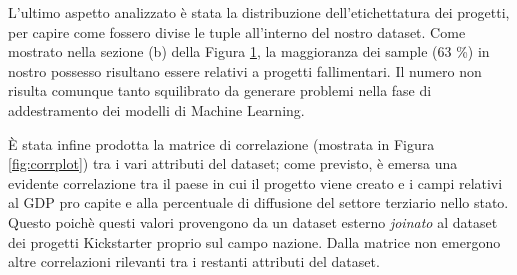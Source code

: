 L'ultimo aspetto analizzato è stata la distribuzione dell'etichettatura dei progetti, per capire come fossero divise le tuple all'interno del nostro dataset. Come mostrato nella sezione (b) della Figura \ref{fig:piestate}, la maggioranza dei sample (63 \%) in nostro possesso risultano essere relativi a progetti fallimentari. Il numero non risulta comunque tanto squilibrato da generare problemi nella fase di addestramento dei modelli di Machine Learning.

\begin{figure}%
	\centering
	\qquad
	\caption{}%
	\label{fig:piestate}%
\end{figure}

È stata infine prodotta la matrice di correlazione (mostrata in Figura \ref{fig:corrplot}) tra i vari attributi del dataset; come previsto, è emersa una evidente correlazione tra il paese in cui il progetto viene creato e i campi relativi al GDP pro capite e alla percentuale di diffusione del settore terziario nello stato. Questo poichè questi valori provengono da un dataset esterno \textit{joinato} al dataset dei progetti Kickstarter proprio sul campo nazione. Dalla matrice non emergono altre correlazioni rilevanti tra i restanti attributi del dataset.

